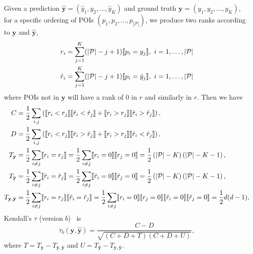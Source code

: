 Given a prediction $\hat{\mathbf{y}} = (\hat{y}_1, \hat{y}_2, \dots, \hat{y}_K)$ and ground truth $\mathbf{y} = (y_1, y_2, \dots, y_K)$,
for a specific ordering of POIs $(p_1, p_2, \dots, p_{|\mathcal{P}|})$,
we produce two ranks according to $\mathbf{y}$ and $\hat{\mathbf{y}}$,
\begin{align*}
r_i       &= \sum_{j=1}^K (| \mathcal{P} | - j + 1)  \llbracket p_i = y_j \rrbracket,~
i = 1, \dots, | \mathcal{P} | \\
\hat{r}_i &= \sum_{j=1}^K (| \mathcal{P} | - j + 1)  \llbracket p_i = \hat{y}_j \rrbracket,~ 
i = 1, \dots, | \mathcal{P} |
\end{align*}
where POIs not in $\mathbf{y}$ will have a rank of $0$ in $r$ and similarly in $r$.
Then we have
\begin{align*}
C &= \frac{1}{2} \sum_{i,j} \left(\llbracket r_i < r_j \rrbracket  \llbracket \hat{r}_i < \hat{r}_j \rrbracket +
     \llbracket r_i > r_j \rrbracket  \llbracket \hat{r}_i > \hat{r}_j \rrbracket \right), \\
D &= \frac{1}{2} \sum_{i,j} \left(\llbracket r_i < r_j \rrbracket  \llbracket \hat{r}_i > \hat{r}_j \rrbracket +
     \llbracket r_i > r_j \rrbracket  \llbracket \hat{r}_i < \hat{r}_j \rrbracket \right), \\
T_{\mathbf{y}} &= \frac{1}{2} \sum_{i \ne j} \llbracket r_i = r_j \rrbracket 
                = \frac{1}{2} \sum_{i \ne j} \llbracket r_i = 0 \rrbracket  \llbracket r_j = 0 \rrbracket 
                = \frac{1}{2} \left( |\mathcal{P}| - K \right) \left( |\mathcal{P}| - K - 1 \right), \\ 
T_{\hat{\mathbf{y}}} &= \frac{1}{2} \sum_{i \ne j} \llbracket \hat{r}_i = \hat{r}_j \rrbracket
                      = \frac{1}{2} \sum_{i \ne j} \llbracket \hat{r}_i = 0 \rrbracket  \llbracket \hat{r}_j = 0 \rrbracket
                      = \frac{1}{2} \left( |\mathcal{P}| - K \right) \left( |\mathcal{P}| - K - 1 \right), \\ 
T_{\mathbf{y},\hat{\mathbf{y}}} &= \frac{1}{2} \sum_{i \ne j} \llbracket r_i = r_j \rrbracket  \llbracket \hat{r}_i = \hat{r}_j \rrbracket
                                 = \frac{1}{2} \sum_{i \ne j} \llbracket r_i = 0 \rrbracket  \llbracket r_j = 0 \rrbracket 
                                   \llbracket \hat{r}_i = 0 \rrbracket  \llbracket \hat{r}_j = 0 \rrbracket
                                 = \frac{1}{2} {d(d-1)},
\end{align*}
Kendall's $\tau$ (version $b$)~\cite{kendall1945,agresti2010analysis} is
\begin{equation*}
\tau_b(\mathbf{y}, \hat{\mathbf{y}}) = \frac{C - D}{\sqrt{(C + D + T) (C + D + U)}},
\end{equation*}
where $T = T_{\mathbf{y}} - T_{\mathbf{y},\hat{\mathbf{y}}}$ and $U = T_{\hat{\mathbf{y}}} - T_{\mathbf{y},\hat{\mathbf{y}}}$.


